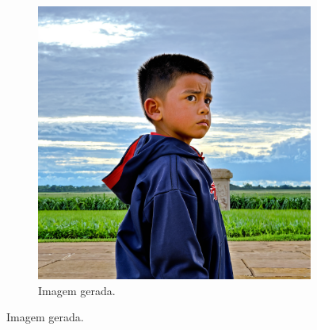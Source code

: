 \begin{figure}[htbp]
\begin{subfigure}{0.45\linewidth}
    \end{subfigure}
    \begin{subfigure}{0.45\linewidth}
        \centering
        \includegraphics[width=1\linewidth]{figs/cgDream/res_char_Jug9_1.png}
        \caption{\small Imagem gerada.}
        \label{fig:cgDream6b}
    \end{subfigure}
\end{figure}

